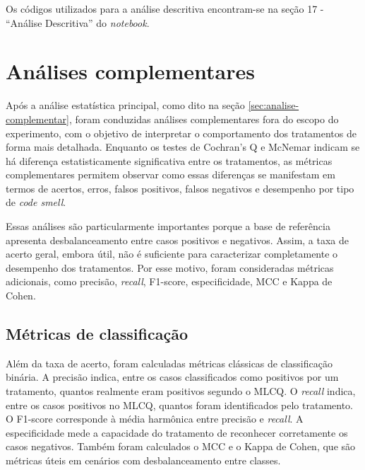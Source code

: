 Os códigos utilizados para a análise descritiva encontram-se na seção 17 - ``Análise Descritiva'' do \textit{notebook}.

\section{Análises complementares}
\label{sec:analise-complementar-resultados}

Após a análise estatística principal, como dito na  seção \ref{sec:analise-complementar}, foram conduzidas análises complementares 
fora do escopo do experimento, com o objetivo de interpretar o comportamento dos tratamentos de forma mais detalhada. 
Enquanto os testes de Cochran's Q e McNemar indicam se há diferença estatisticamente significativa entre os tratamentos, 
as métricas complementares permitem observar como essas diferenças se manifestam em termos de acertos, erros, falsos positivos, 
falsos negativos e desempenho por tipo de \textit{code smell}.

Essas análises são particularmente importantes porque a base de referência apresenta desbalanceamento entre casos positivos e negativos. 
Assim, a taxa de acerto geral, embora útil, não é suficiente para caracterizar completamente o desempenho dos tratamentos. 
Por esse motivo, foram consideradas métricas adicionais, como precisão, \textit{recall}, F1-score, especificidade, MCC e Kappa de Cohen.

\subsection{Métricas de classificação}

Além da taxa de acerto, foram calculadas métricas clássicas de classificação binária. A precisão indica, entre os casos classificados 
como positivos por um tratamento, quantos realmente eram positivos segundo o MLCQ. O \textit{recall} indica, entre os casos positivos no MLCQ, 
quantos foram identificados pelo tratamento. O F1-score corresponde à média harmônica entre precisão e \textit{recall}. A especificidade mede 
a capacidade do tratamento de reconhecer corretamente os casos negativos. Também foram calculados o MCC e o Kappa de Cohen, que são métricas 
úteis em cenários com desbalanceamento entre classes.

